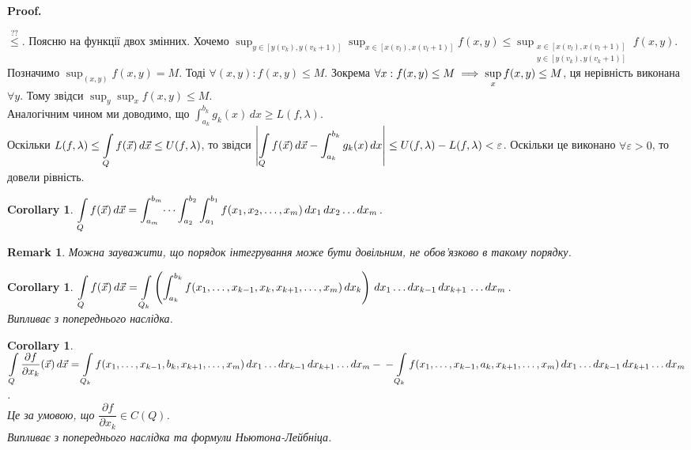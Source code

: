 \documentclass[a4paper, 10pt]{article}
\makeatletter
\def\departial#1#2{\dfrac{\partial {#1}}{\partial {#2}}}
\def\qed{$\blacksquare$}
\theoremstyle{theoremdd}
\theoremstyle{theoremdd}
\theoremstyle{theoremdd}
\theoremstyle{theoremdd}
\theoremstyle{theoremdd}
\theoremstyle{theoremdd}
\newtheorem{remark}[theorem]{Remark}
\theoremstyle{theoremdd}
\theoremstyle{theoremdd}
\newtheorem{corollary}[theorem]{Corollary}
\renewenvironment{proof}[1][Proof.\\]{\par
\pushQED{\hfill \qed}%
\normalfont \topsep6\p@\@plus6\p@\relax
\trivlist
\item\relax
{\bfseries
#1\@addpunct{.}}\hspace\labelsep\ignorespaces
}{%
\popQED\endtrivlist\@endpefalse
}
\makeatother
\begin{document}
\begin{proof}
$\overset{??}{\leq}$. Поясню на функції двох змінних. Хочемо $\displaystyle\sup_{y \in [y(v_k),y(v_k+1)]} \sup_{x \in [x(v_l),x(v_l+1)]} f(x,y) \leq \sup_{\substack{x \in [x(v_l),x(v_l+1)] \\ y \in [y(v_k),y(v_k+1)]}} f(x,y)$.\\
Позначимо $\displaystyle\sup_{(x,y)} f(x,y) = M$. Тоді $\forall (x,y): f(x,y) \leq M$. Зокрема $\forall x: f(x,y) \leq M \\ \implies \displaystyle\sup_x f(x,y) \leq M$, ця нерівність виконана $\forall y$. Тому звідси $\displaystyle\sup_y \sup_x f(x,y) \leq M$.\\
Аналогічним чином ми доводимо, що $\displaystyle\int_{a_k}^{b_k} g_k(x)\,dx \geq L(f,\lambda)$.\\
Оскільки $L(f,\lambda) \leq \displaystyle\int\displaylimits_Q f(\vec{x})\,d \vec{x} \leq U(f,\lambda)$, то звідси $\displaystyle\abs{\int\displaylimits_Q f(\vec{x})\,d \vec{x} - \int_{a_k}^{b_k} g_k(x)\,dx} \leq U(f,\lambda) - L(f,\lambda) < \varepsilon$. Оскільки це виконано $\forall \varepsilon >0$, то довели рівність.
\end{proof}

\begin{corollary}
$\displaystyle\int\displaylimits_Q f(\vec{x})\,d\vec{x} = \int_{a_m}^{b_m} \dots \int_{a_2}^{b_2} \int_{a_1}^{b_1} f(x_1,x_2,\dots,x_m)\,dx_1\,dx_2 \dots dx_m$.
\end{corollary}

\begin{remark}
Можна зауважити, що порядок інтегрування може бути довільним, не обов'язково в такому порядку.
\end{remark}

\begin{corollary}
\label{multiple_integral_reducing_dimension_2}
$\displaystyle\int\displaylimits_Q f(\vec{x})\,d\vec{x} = \int\displaylimits_{Q_k} \left( \int_{a_k}^{b_k} f(x_1,\dots,x_{k-1},x_k,x_{k+1},\dots,x_m)\,dx_k \right)\,dx_1 \dots dx_{k-1}\,dx_{k+1}\,\dots dx_m$.\\
\textit{Випливає з попереднього наслідка.}
\end{corollary}

\begin{corollary}
\label{lagrange_and_integral}
$\displaystyle\int\displaylimits_Q \departial{f}{x_k}(\vec{x})\,d\vec{x} = \displaystyle\int\displaylimits_{Q_k} f(x_1,\dots,x_{k-1},b_k,x_{k+1},\dots,x_m)\,dx_1\dots dx_{k-1}\,dx_{k+1}\dots dx_m - \\ - \int\displaylimits_{Q_k} f(x_1,\dots,x_{k-1},a_k,x_{k+1},\dots,x_m)\,dx_1\dots dx_{k-1}\,dx_{k+1}\dots dx_m$.\\
Це за умовою, що $\departial{f}{x_k} \in C(Q)$.\\
\textit{Випливає з попереднього наслідка та формули Ньютона-Лейбніца.}
\end{corollary}
\end{document}
